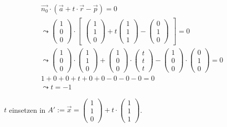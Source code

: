 \begin{gather}
\vec{n_0} \cdot (\vec{a}+t\cdot \vec{r}-\vec{p})=0\\
\leadsto 
\begin{pmatrix}
1\\0\\0
\end{pmatrix} \cdot 
\begin{bmatrix}
\begin{pmatrix}
1\\1\\0
\end{pmatrix}
+ t
\begin{pmatrix}
1\\1\\1
\end{pmatrix}
-
\begin{pmatrix}
0\\1\\0
\end{pmatrix}
\end{bmatrix} = 0\\
\leadsto
\begin{pmatrix}
1\\0\\0
\end{pmatrix}\cdot
\begin{pmatrix}
1\\1\\0
\end{pmatrix}
+
\begin{pmatrix}
1\\0\\0
\end{pmatrix}
\cdot
\begin{pmatrix}
t\\t\\t
\end{pmatrix}
-
\begin{pmatrix}
1\\0\\0
\end{pmatrix}
\cdot
\begin{pmatrix}
0\\1\\0
\end{pmatrix} =0\\
1+0+0+t+0+0-0-0-0=0\\
\leadsto t=-1
\end{gather}

\ensuremath{t} einsetzen in \ensuremath{A':= \vec{x}=\begin{pmatrix}
		1\\1\\0
	\end{pmatrix} +t\cdot\begin{pmatrix}
		1\\1\\1
\end{pmatrix}}.\\

